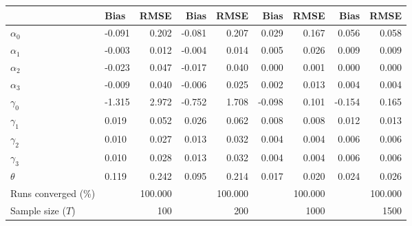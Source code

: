 
\begin{tabular}[t]{llrrrrrrr}
\toprule
  & Bias & RMSE & Bias & RMSE & Bias & RMSE & Bias & RMSE\\
\midrule
$\alpha_{0}$ & -0.091 & 0.202 & -0.081 & 0.207 & 0.029 & 0.167 & 0.056 & 0.058\\
$\alpha_{1}$ & -0.003 & 0.012 & -0.004 & 0.014 & 0.005 & 0.026 & 0.009 & 0.009\\
$\alpha_{2}$ & -0.023 & 0.047 & -0.017 & 0.040 & 0.000 & 0.001 & 0.000 & 0.000\\
$\alpha_{3}$ & -0.009 & 0.040 & -0.006 & 0.025 & 0.002 & 0.013 & 0.004 & 0.004\\
$\gamma_{0}$ & -1.315 & 2.972 & -0.752 & 1.708 & -0.098 & 0.101 & -0.154 & 0.165\\
$\gamma_{1}$ & 0.019 & 0.052 & 0.026 & 0.062 & 0.008 & 0.008 & 0.012 & 0.013\\
$\gamma_{2}$ & 0.010 & 0.027 & 0.013 & 0.032 & 0.004 & 0.004 & 0.006 & 0.006\\
$\gamma_{3}$ & 0.010 & 0.028 & 0.013 & 0.032 & 0.004 & 0.004 & 0.006 & 0.006\\
$\theta$ & 0.119 & 0.242 & 0.095 & 0.214 & 0.017 & 0.020 & 0.024 & 0.026\\
Runs converged (\%) &  & 100.000 &  & 100.000 &  & 100.000 &  & 100.000\\
Sample size ($T$) &  & 100 &  & 200 &  & 1000 &  & 1500\\
\bottomrule
\end{tabular}
